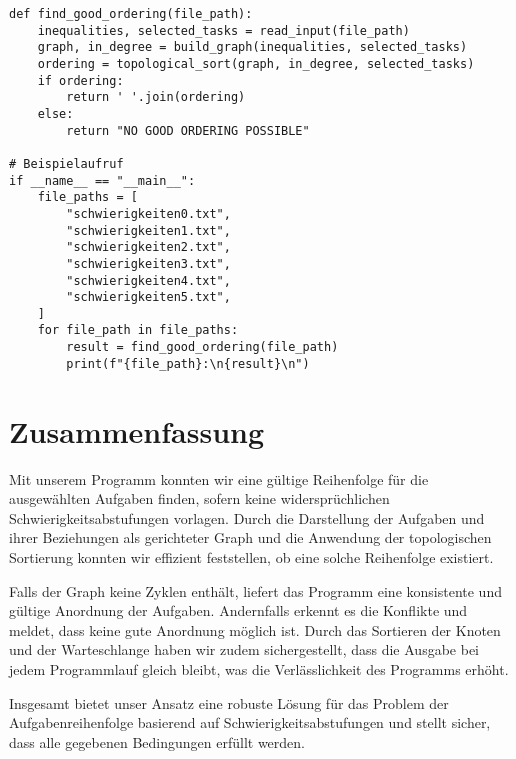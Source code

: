 \documentclass{article}
\begin{document}
\begin{lstlisting}[style=custompython]
def find_good_ordering(file_path):
    inequalities, selected_tasks = read_input(file_path)
    graph, in_degree = build_graph(inequalities, selected_tasks)
    ordering = topological_sort(graph, in_degree, selected_tasks)
    if ordering:
        return ' '.join(ordering)
    else:
        return "NO GOOD ORDERING POSSIBLE"

# Beispielaufruf
if __name__ == "__main__":
    file_paths = [
        "schwierigkeiten0.txt",
        "schwierigkeiten1.txt",
        "schwierigkeiten2.txt",
        "schwierigkeiten3.txt",
        "schwierigkeiten4.txt",
        "schwierigkeiten5.txt",
    ]
    for file_path in file_paths:
        result = find_good_ordering(file_path)
        print(f"{file_path}:\n{result}\n")
\end{lstlisting}

\section{Zusammenfassung}

Mit unserem Programm konnten wir eine gültige Reihenfolge für die ausgewählten Aufgaben finden, sofern keine widersprüchlichen Schwierigkeitsabstufungen vorlagen. Durch die Darstellung der Aufgaben und ihrer Beziehungen als gerichteter Graph und die Anwendung der topologischen Sortierung konnten wir effizient feststellen, ob eine solche Reihenfolge existiert.

Falls der Graph keine Zyklen enthält, liefert das Programm eine konsistente und gültige Anordnung der Aufgaben. Andernfalls erkennt es die Konflikte und meldet, dass keine gute Anordnung möglich ist. Durch das Sortieren der Knoten und der Warteschlange haben wir zudem sichergestellt, dass die Ausgabe bei jedem Programmlauf gleich bleibt, was die Verlässlichkeit des Programms erhöht.

Insgesamt bietet unser Ansatz eine robuste Lösung für das Problem der Aufgabenreihenfolge basierend auf Schwierigkeitsabstufungen und stellt sicher, dass alle gegebenen Bedingungen erfüllt werden.
\end{document}
